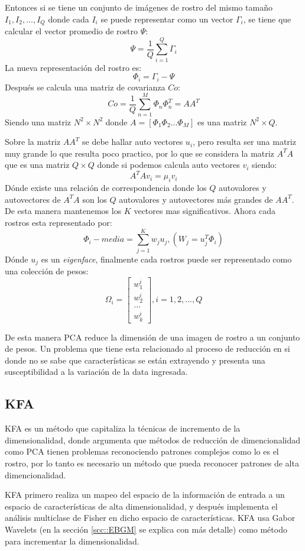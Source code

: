 Entonces si se tiene un conjunto de imágenes de rostro del mismo tamaño ${I_1,I_2,...,I_Q}$ donde cada $I_i$ se puede representar como un vector $\Gamma_i$, se tiene que calcular el vector promedio de rostro $\Psi$:
\[\Psi =\frac{1}{Q}\sum^Q_{i=1}\Gamma_i\] 
La nueva representación del rostro es: 
\[\Phi_i=\Gamma_i-\Psi\]
Después se calcula una matriz de covarianza $Co$:
\[Co=\frac{1}{Q}\sum^M_{n=1}\Phi_n \Phi^T_n=AA^T \]
Siendo una matriz $N^2\times N^2$ donde $A=[\Phi_1\Phi_2...\Phi_M]$ es una matriz $N^2\times Q$.

Sobre la matriz $AA^T$ se debe hallar auto vectores $u_i$, pero resulta ser una matriz muy grande lo que resulta poco practico, por lo que se considera la matriz $A^TA$ que es una matriz $Q\times Q$ donde si podemos calcula auto vectores $v_i$ siendo: 
\[A^TAv_i=\mu_iv_i\]
Dónde existe una relación de correspondencia donde los $Q$ autovalores y autovectores de $A^TA$ son los $Q$ autovalores y autovectores más grandes de $AA^T$. De esta manera mantenemos los $K$ vectores mas significativos. Ahora cada rostros esta representado por: 
\[\Phi_i-media= \sum^{K}_{j=1} w_j u_j, (W_j=u^T_j\Phi_i)\]
Dónde $u_j$ es un \textit{eigenface}, finalmente cada rostros puede ser representado como una colección de pesos:
\[\Omega_i=\begin{bmatrix}
w^i_1\\ 
w^i_2\\ 
...\\ 
w^i_k
\end{bmatrix} , i=1,2,...,Q\]

De esta manera \ac{PCA} reduce la dimensión de una imagen de rostro a un conjunto de pesos. Un problema que tiene esta relacionado al proceso de reducción en si donde no se sabe que características se están extrayendo y presenta una susceptibilidad a la variación de la data ingresada.

\subsection{\ac{KFA}}
\ac{KFA} \cite{liu2006capitalize} es un método que capitaliza la técnicas de incremento de la dimensionalidad, donde argumenta que métodos de reducción de dimencionalidad como \ac{PCA} tienen problemas reconociendo patrones complejos como lo es el rostro, por lo tanto es necesario un método que pueda reconocer patrones de alta dimencionalidad.

\ac{KFA} primero realiza un mapeo del espacio de la información de entrada a un espacio de características de alta dimensionalidad, y después implementa el análisis multiclase de Fisher en dicho espacio de características. \ac{KFA} usa Gabor Wavelets (en la sección \ref{scc::EBGM} se explica con más detalle) como método para incrementar la dimensionalidad.

